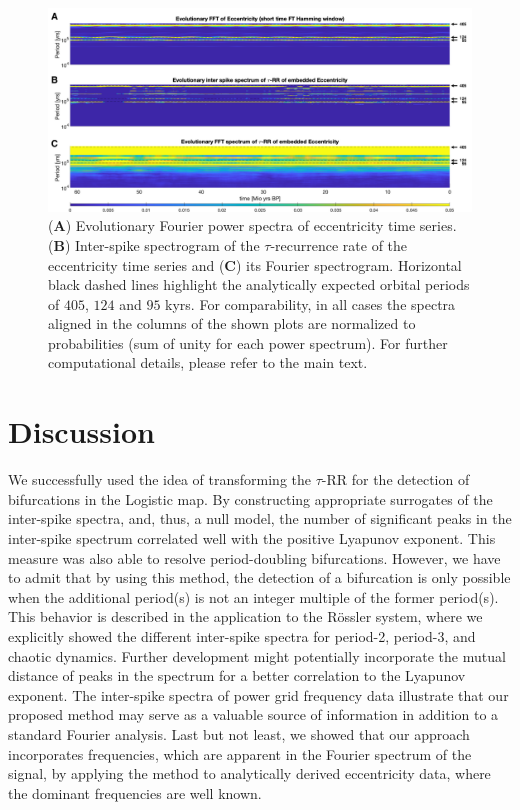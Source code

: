 \documentclass[entropy,article,accept,pdftex,moreauthors]{Definitions/mdpi}
\begin{document}
\begin{figure}[H]
 \includegraphics[width=\textwidth]{figures/fig_laskar_spectra}
 \caption{(\textbf{A}) Evolutionary Fourier power spectra of eccentricity time series. (\textbf{B}) Inter-spike spectrogram of the $\tau$-recurrence rate of the eccentricity time 
 series and (\textbf{C}) its Fourier spectrogram. Horizontal black dashed lines highlight the analytically expected orbital periods of $405$, $124$ and $95$ kyrs. 
 For comparability, in all cases the spectra aligned in the columns of the shown plots are normalized to probabilities (sum of unity for 
 each power spectrum). For further computational details, please refer to the main text.}  
\label{fig_laskar_spectra}
\end{figure}


\section{Discussion}\label{sec_tau_rr_discussion}

We successfully used the idea of transforming the $\tau$-RR for the detection of bifurcations in the Logistic map. By constructing appropriate surrogates of the inter-spike spectra, 
and, thus, a null model, the number of significant peaks in the inter-spike spectrum correlated well with the positive Lyapunov exponent. This measure was also able to resolve 
period-doubling bifurcations. However, we have to admit that by using this method, the detection of a bifurcation is only possible when the additional period(s) is not an integer multiple of the former period(s). 
This behavior is described in the application to the R\"ossler system, where we explicitly showed the different inter-spike spectra for period-2, period-3, and chaotic dynamics.
Further development might potentially incorporate the mutual distance of peaks in the spectrum for a better correlation to the Lyapunov exponent. The inter-spike spectra of power grid 
	frequency data illustrate that our proposed method may serve as a valuable source of information in addition to a standard Fourier analysis. Last but not least, we showed that our approach incorporates frequencies, which are apparent in the Fourier spectrum of the signal, by applying the method to analytically derived eccentricity data, where the dominant frequencies are well 
known.
\end{document}
